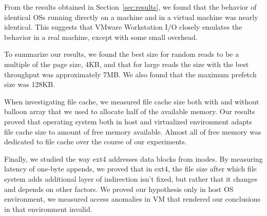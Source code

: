 From the results obtained in Section~\ref{sec:results}, we found that the behavior
of identical OSs running directly on a machine and in a virtual machine was 
nearly identical. This suggests that VMware Workstation I/O closely emulates 
the behavior in a real machine, except with some small overhead.

To summarize our results, we found the best size for random reads to be a multiple 
of the page size, 4KB, and that for large reads the size with the best throughput
was approximately 7MB. We also found that the maximum prefetch size was 128KB.

When investigating file cache, we measured file cache size both with and without balloon array
that we used to allocate half of the available memory. 
Our results proved that operating system both in host and virtualized environment 
adapts file cache size to amount of free memory available. Almost all of free memory was dedicated
to file cache over the course of our experiments.

Finally, we studied the way ext4 addresses data blocks from inodes. By measuring latency of one-byte appends, 
we proved that in ext4, the file size after which file system adds additional layer of indirection isn't fixed,
 but rather that it changes and depends on other factors. We proved our hypothesis only in host OS environment, we
measured access anomalies in VM that rendered our conclusions in that environment invalid.
